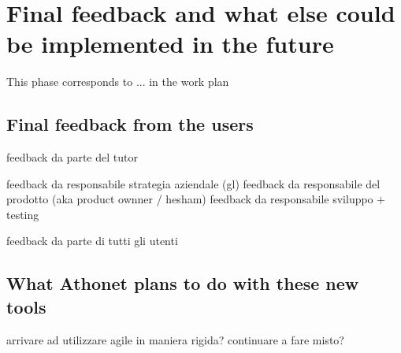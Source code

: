 \section{Final feedback and what else could be implemented in the future}

	This phase corresponds to ... in the work plan

	\subsection{Final feedback from the users}
		feedback da parte del tutor
		
		feedback da responsabile strategia aziendale (gl)
		feedback da responsabile del prodotto (aka product ownner / hesham)
		feedback da responsabile sviluppo + testing
			
		feedback da parte di tutti gli utenti
	
	\subsection{What Athonet plans to do with these new tools}
		arrivare ad utilizzare agile in maniera rigida?
		continuare a fare misto?
